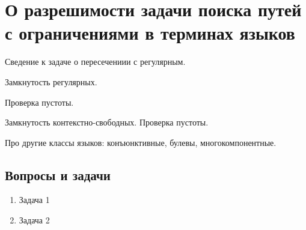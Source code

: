 \section{О разрешимости задачи поиска путей с ограничениями в терминах языков}

Сведение к задаче о пересечениии с регулярным.

Замкнутость регулярных.

Проверка пустоты.

Замкнутость контекстно-свободных.
Проверка пустоты.

Про другие классы языков: конъюнктивные, булевы, многокомпонентные.

\subsection{Вопросы и задачи}
\begin{enumerate}
  \item Задача 1
  \item Задача 2
\end{enumerate}
